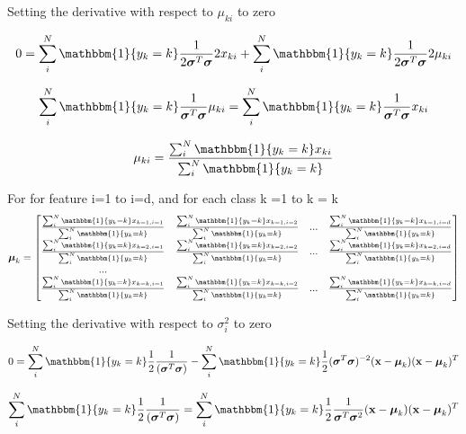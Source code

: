 \documentclass[12pt,letterpaper]{article} %
\newcommand{\bs}[1]{\bm{\mathrm{#1}}} %
\newcommand{\switch}[0]{\mathbbm{1}\{y_k=k\}}
\begin{document}
\subsection{}

Setting the derivative with respect to $\mu_{ki}$  to zero

\begin{equation*}
 0 = \sum^N_i\switch\frac{1}{2\bs{\sigma}^T\bs{\sigma}}2x_{ki} + \sum^N_i\switch\frac{1}{2\bs{\sigma}^T\bs{\sigma}}2\mu_{ki}
\end{equation*}

\begin{equation*}
\sum^N_i\switch\frac{1}{\bs{\sigma}^T\bs{\sigma}}\mu_{ki} = \sum^N_i\switch\frac{1}{\bs{\sigma}^T\bs{\sigma}}x_{ki} 
\end{equation*}

\begin{equation*}
 \mu_{ki} = \frac{ \sum^N_i\switch{}x_{ki} }{\sum^N_i\switch}
\end{equation*}


For for feature i=1 to i=d, and for each class k =1 to k = k
\begin{equation*}
\bs{\mu}_k = \begin{bmatrix} \frac{ \sum^N_i\switch{}x_{k=1,i=1} }{\sum^N_i\switch} & \frac{ \sum^N_i\switch{}x_{k=1,i=2} }{\sum^N_i\switch} & ... & \frac{ \sum^N_i\switch{}x_{k=1, i=d} }{\sum^N_i\switch}\\  \frac{ \sum^N_i\switch{}x_{k=2,i=1} }{\sum^N_i\switch} & \frac{ \sum^N_i\switch{}x_{k=2,i=2} }{\sum^N_i\switch} & ... & \frac{ \sum^N_i\switch{}x_{k=2, i=d} }{\sum^N_i\switch} \\ ... \\  \frac{ \sum^N_i\switch{}x_{k=k,i=1} }{\sum^N_i\switch} & \frac{ \sum^N_i\switch{}x_{k=k,i=2} }{\sum^N_i\switch} & ... & \frac{ \sum^N_i\switch{}x_{k=k, i=d} }{\sum^N_i\switch} \end{bmatrix}
\end{equation*}

\clearpage
Setting the derivative with respect to $\sigma^2_{i}$  to zero

\begin{equation*}
0 =\sum^N_i\switch\frac{1}{2}\frac{1}{(\bs{\sigma}^T\bs{\sigma})} - \sum^N_i\switch\frac{1}{2}(\bs{\sigma}^T\bs{\sigma})^{-2}(\bs{x}-\bs{\mu}_k)(\bs{x}-\bs{\mu}_k)^T
 \end{equation*}
 
 
 \begin{equation*}
\sum^N_i\switch\frac{1}{2}\frac{1}{(\bs{\sigma}^T\bs{\sigma})}  = \sum^N_i\switch\frac{1}{2}\frac{1}{\bs{\sigma}^T\bs{\sigma}^2}(\bs{x}-\bs{\mu}_k)(\bs{x}-\bs{\mu}_k)^T
 \end{equation*}
 
\end{document}
